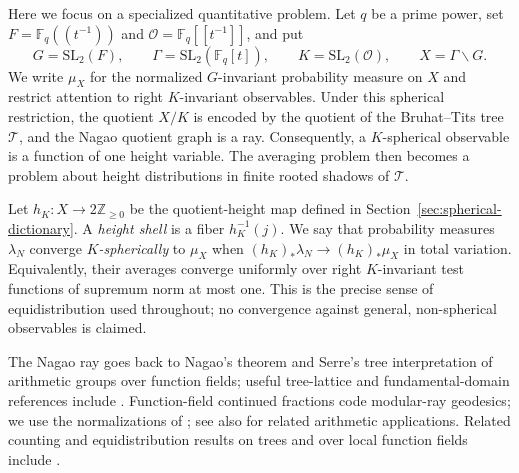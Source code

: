 \documentclass[11pt]{amsart}
\theoremstyle{definition}
\theoremstyle{plain}
\newcommand{\Fq}{\mathbb F_q}
\newcommand{\Floc}{\mathbb F_q(\!(t^{-1})\!)}
\newcommand{\cO}{\mathcal O}
\newcommand{\Tree}{\mathcal T}
\newcommand{\ZZ}{\mathbb Z}
\begin{document}
Here we focus on a specialized quantitative problem.  Let \(q\) be a prime power,
set \(F=\Floc\) and \(\cO=\Fq[\![t^{-1}]\!]\), and put
\[
G=\mathrm{SL}_2(F),\qquad
\Gamma=\mathrm{SL}_2(\Fq[t]),\qquad
K=\mathrm{SL}_2(\cO),\qquad
X=\Gamma\backslash G.
\]
We write \(\mu_X\) for the normalized \(G\)-invariant probability measure on
\(X\) and restrict attention to right \(K\)-invariant observables.  Under this
spherical restriction, the quotient \(X/K\) is encoded by the quotient of the
Bruhat--Tits tree \(\Tree\), and the Nagao quotient graph is a ray.  Consequently,
a \(K\)-spherical observable is a function of one height variable.  The averaging
problem then becomes a problem about height distributions in finite rooted
shadows of \(\Tree\).

Let \(h_K:X\to2\ZZ_{\ge0}\) be the quotient-height map
defined in Section~\ref{sec:spherical-dictionary}.  A \emph{height shell} is a
fiber \(h_K^{-1}(j)\).  We say that probability measures \(\lambda_N\) converge
\emph{\(K\)-spherically} to \(\mu_X\) when
\((h_K)_*\lambda_N\to(h_K)_*\mu_X\) in total variation.  Equivalently, their
averages converge uniformly over right \(K\)-invariant test functions of
supremum norm at most one.  This is the precise sense of equidistribution used
throughout; no convergence against general, non-spherical observables is
claimed.

The Nagao ray goes back to Nagao's theorem and Serre's tree interpretation of
arithmetic groups over function fields; useful tree-lattice and
fundamental-domain references include
\cite{Nagao1959,SerreTrees,Tits1979,Lubotzky1994,BassLubotzky2001,Kwon2020}.
Function-field continued fractions code modular-ray geodesics; we use the
normalizations of \cite{Paulin2002,BroisePaulin2007}; see also
\cite{PaulinShapira2020} for related arithmetic applications.  Related counting and
equidistribution results on trees and over local function fields include
\cite{BroiseParkkonenPaulin2019,KwonLim2021,Bravo2024,ParkkonenPaulin2024}.
\end{document}
